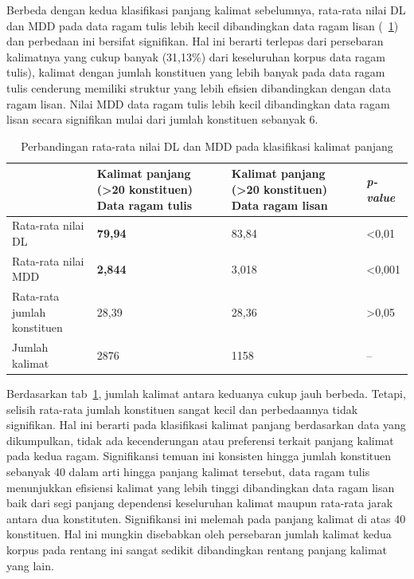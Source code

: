 Berbeda dengan kedua klasifikasi panjang kalimat sebelumnya, rata-rata nilai DL dan MDD pada data ragam tulis lebih kecil dibandingkan data ragam lisan (\tab~\ref{tab:DL_MDD_panjang}) dan perbedaan ini bersifat signifikan. Hal ini berarti terlepas dari persebaran kalimatnya yang cukup banyak (31,13\%) dari keseluruhan korpus data ragam tulis), kalimat dengan jumlah konstituen yang lebih banyak pada data ragam tulis cenderung memiliki struktur yang lebih efisien dibandingkan dengan data ragam lisan. Nilai MDD data ragam tulis lebih kecil dibandingkan data ragam lisan secara signifikan mulai dari jumlah konstituen sebanyak 6. 

\begin{table}
\begin{center}
\begin{small}
\caption{Perbandingan rata-rata nilai DL dan MDD pada klasifikasi kalimat panjang}  \label{tab:DL_MDD_panjang}
\begin{tabular}{ | p{3.2cm} | p{3.2cm} | p{3.2cm} | p{2cm} |}
    \hline
 & Kalimat panjang \newline (\textgreater20 konstituen) \newline Data ragam tulis & Kalimat panjang \newline (\textgreater20 konstituen) \newline Data ragam lisan & \textit{p-value} \\ \hline
 Rata-rata nilai DL & \textbf{79,94} & 83,84 & \textless 0,01 \\ \hline
 Rata-rata nilai MDD & \textbf{2,844} & 3,018 & \textless 0,001 \\ \hline
 Rata-rata jumlah konstituen & 28,39 & 28,36 & \textgreater 0,05 \\ \hline
 Jumlah kalimat & 2876 & 1158 & -- \\ \hline
   \end{tabular}
   \end{small}
\end{center}
\end{table}

Berdasarkan tab~\ref{tab:DL_MDD_panjang}, jumlah kalimat antara keduanya cukup jauh berbeda. Tetapi, selisih rata-rata jumlah konstituen sangat kecil dan perbedaannya tidak signifikan. Hal ini berarti pada klasifikasi kalimat panjang berdasarkan data yang dikumpulkan, tidak ada kecenderungan atau preferensi terkait panjang kalimat pada kedua ragam. Signifikansi temuan ini konsisten hingga jumlah konstituen sebanyak 40 dalam arti hingga panjang kalimat tersebut, data ragam tulis menunjukkan efisiensi kalimat yang lebih tinggi dibandingkan data ragam lisan baik dari segi panjang dependensi keseluruhan kalimat maupun rata-rata jarak antara dua konstituten. Signifikansi ini melemah pada panjang kalimat di atas 40 konstituen. Hal ini mungkin disebabkan oleh persebaran jumlah kalimat kedua korpus pada rentang ini sangat sedikit dibandingkan rentang panjang kalimat yang lain.  

